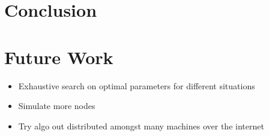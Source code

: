 \section{Conclusion}




\section{Future Work}


\begin{itemize}
	\item Exhaustive search on optimal parameters for different situations
	\item Simulate more nodes
	\item Try algo out distributed amongst many machines over the internet
\end{itemize}